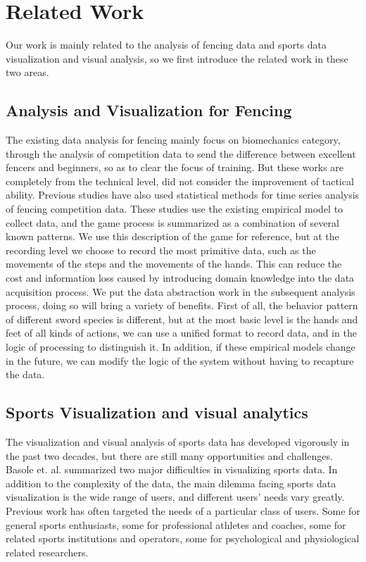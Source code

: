 \documentclass[journal]{vgtc}                %
\begin{document}
\section{Related Work}
Our work is mainly related to the analysis of fencing data and sports data visualization and visual analysis, so we first introduce the related work in these two areas.

\subsection{Analysis and Visualization for Fencing}
The existing data analysis for fencing mainly focus on biomechanics category, through the analysis of competition data to send the difference between excellent fencers and beginners, so as to clear the focus of training\cite{chen2017biomechanics}. But these works are completely from the technical level, did not consider the improvement of tactical ability. 
Previous studies have also used statistical methods for time series analysis of fencing competition data\cite{tarrago2016complementary}. These studies use the existing empirical model to collect data, and the game process is summarized as a combination of several known patterns\cite{tarrago2015analisis}. We use this description of the game for reference, but at the recording level we choose to record the most primitive data, such as the movements of the steps and the movements of the hands. This can reduce the cost and information loss caused by introducing domain knowledge into the data acquisition process. We put the data abstraction work in the subsequent analysis process, doing so will bring a variety of benefits. First of all, the behavior pattern of different sword species is different, but at the most basic level is the hands and feet of all kinds of actions, we can use a unified format to record data, and in the logic of processing to distinguish it. In addition, if these empirical models change in the future, we can modify the logic of the system without having to recapture the data.

\subsection{Sports Visualization and visual analytics}
The visualization and visual analysis of sports data has developed vigorously in the past two decades, but there are still many opportunities and challenges.
Basole et. al. summarized two major difficulties in visualizing sports data\cite{basole2016sports}.
In addition to the complexity of the data, the main dilemma facing sports data visualization is the wide range of users, and different users' needs vary greatly.
Previous work has often targeted the needs of a particular class of users.
Some for general sports enthusiasts, some for professional athletes and coaches, some for related sports institutions and operators, some for psychological and physiological related researchers.
\end{document}
